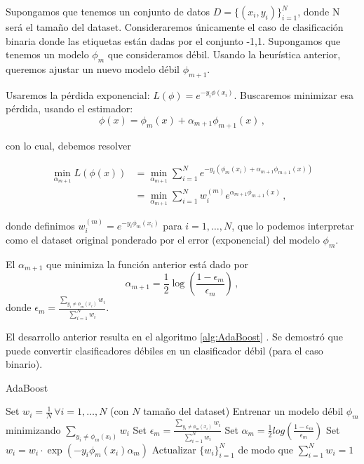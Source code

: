Supongamos que tenemos un conjunto de datos $D = \{(x_i,y_i)\}^N_{i=1}$, donde N será el tamaño del dataset. Consideraremos únicamente el caso de clasificación binaria donde las etiquetas están dadas por el conjunto {-1,1}. Supongamos que tenemos un modelo $\phi_m$ que consideramos débil. Usando la heurística anterior, queremos ajustar un nuevo modelo débil $\phi_{m+1}$.

Usaremos la pérdida exponencial: $L(\phi) = e^{-y_i \phi(x_i)}$. Buscaremos minimizar esa pérdida, usando el estimador:
$$ \phi(x) = \phi_m(x) + \alpha_{m+1}\phi_{m+1}(x)\,, $$

con lo cual, debemos resolver

\begin{align}
    \min_{\alpha_{m+1}} L(\phi(x)) & = \min_{\alpha_{m+1}} \sum^N_{i=1} e^{-y_i (\phi_m(x_i) + \alpha_{m+1} \phi_{m+1}(x))} \\
    & = \min_{\alpha_{m+1}} \sum^N_{i=1} w_i^{(m)} e^{\alpha_{m+1} \phi_{m+1}(x)} \,,
\end{align}

donde definimos $w_i^{(m)} = e^{-y_i \phi_m(x_i)}$ para $i = 1,\dots,N$, que lo podemos interpretar como el dataset original ponderado por el error (exponencial) del modelo $\phi_m$.

\begin{lemma}
    El $\alpha_{m+1}$ que minimiza la función anterior está dado por
    \begin{equation}
        \alpha_{m+1} = \frac{1}{2} \log(\frac{1-\epsilon_m}{\epsilon_m})\,,
    \end{equation}
    donde  $\epsilon_m = \displaystyle \frac{ \sum_{y_i \neq \phi_m(x_i)} w_i}{\sum_{i=1}^N w_i} $.
\end{lemma}

El desarrollo anterior resulta en el algoritmo \ref{alg:AdaBoost} \cite{freund1997decision,ESLbook}. Se demostró que puede convertir clasificadores débiles en un clasificador débil (para el caso binario).

\begin{algorithm}[H]
  \caption{AdaBoost
    \label{alg:AdaBoost}}
  \begin{algorithmic}[1]
  \State Set $w_i = \frac{1}{N}\,\forall i=1,\dots,N$ (con $N$ tamaño del dataset)
        \State Entrenar un modelo débil $\phi_m$  minimizando $\displaystyle \sum_{y_i \neq \phi_m(x_i)} w_i$
        \State Set $\epsilon_m = \displaystyle \frac{ \sum_{y_i \neq \phi_m(x_i)} w_i}{\sum_{i=1}^N w_i}$
        \State Set $\alpha_{m} = \frac{1}{2} log(\frac{1 - \epsilon_m}{\epsilon_m})$
        \State Set $w_i = w_i \cdot \exp(-y_i \phi_m(x_i) \alpha_m)$ %
        \State Actualizar $\{w_i\}^N_{i=1}$ de modo que $\sum^N_{i=1} w_i = 1$
    \EndFor
    \EndFunction
  \end{algorithmic}
\end{algorithm}


